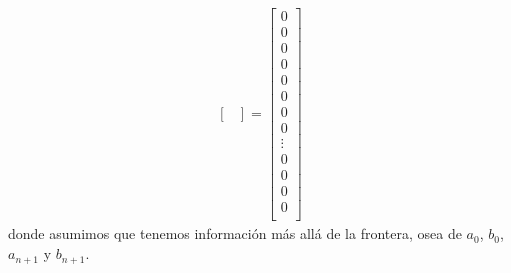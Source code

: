 \documentclass[]{article}%
\begin{document}
\begin{equation}
\begin{split}
\begin{bmatrix}
\end{bmatrix}
= 
\begin{bmatrix}
0 \\ 0 \\0 \\0\\0 \\0\\0\\0\\
\vdots \\ 
0 \\0\\0\\0\\
\end{bmatrix}
\end{split}
\end{equation}
donde asumimos que tenemos información más allá de la frontera, osea de $a_0$, $b_0$, $a_{n+1}$ y $b_{n+1}$. 
\end{document}
